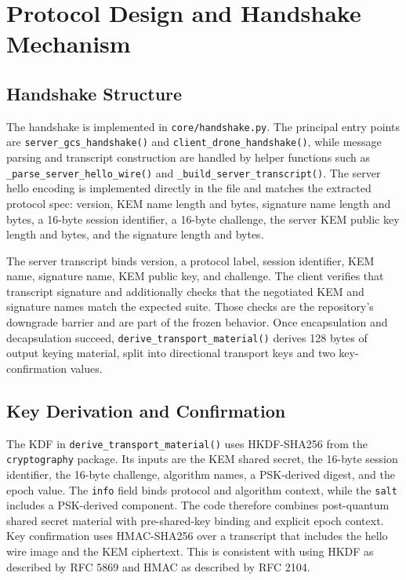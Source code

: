 \documentclass[11pt]{article}
\begin{document}
\section{Protocol Design and Handshake Mechanism}
\subsection{Handshake Structure}
The handshake is implemented in \texttt{core/handshake.py}. The principal entry points are \texttt{server\_gcs\_handshake()} and \texttt{client\_drone\_handshake()}, while message parsing and transcript construction are handled by helper functions such as \texttt{\_parse\_server\_hello\_wire()} and \texttt{\_build\_server\_transcript()}. The server hello encoding is implemented directly in the file and matches the extracted protocol spec: version, KEM name length and bytes, signature name length and bytes, a 16-byte session identifier, a 16-byte challenge, the server KEM public key length and bytes, and the signature length and bytes.

The server transcript binds version, a protocol label, session identifier, KEM name, signature name, KEM public key, and challenge. The client verifies that transcript signature and additionally checks that the negotiated KEM and signature names match the expected suite. Those checks are the repository's downgrade barrier and are part of the frozen behavior. Once encapsulation and decapsulation succeed, \texttt{derive\_transport\_material()} derives 128 bytes of output keying material, split into directional transport keys and two key-confirmation values.

\subsection{Key Derivation and Confirmation}
The KDF in \texttt{derive\_transport\_material()} uses HKDF-SHA256 from the \texttt{cryptography} package. Its inputs are the KEM shared secret, the 16-byte session identifier, the 16-byte challenge, algorithm names, a PSK-derived digest, and the epoch value. The \texttt{info} field binds protocol and algorithm context, while the \texttt{salt} includes a PSK-derived component. The code therefore combines post-quantum shared secret material with pre-shared-key binding and explicit epoch context. Key confirmation uses HMAC-SHA256 over a transcript that includes the hello wire image and the KEM ciphertext. This is consistent with using HKDF as described by RFC 5869 and HMAC as described by RFC 2104.
\end{document}
